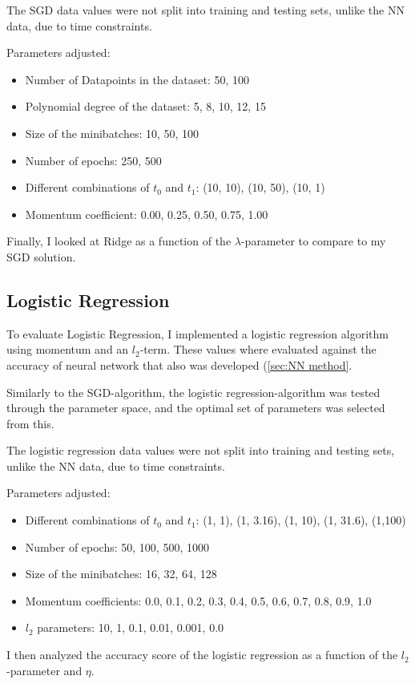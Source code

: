 \documentclass[a4paper, UKenglish]{article}
\newcommand{\0}{\mathbf{0}}
\newcommand{\1}{\mathbf{1}}
\begin{document}
The SGD data values were not split into training and testing sets, unlike the NN data, due to time constraints.

Parameters adjusted:
\begin{itemize}
\item Number of Datapoints in the dataset: 50, 100
\item Polynomial degree of the dataset: 5, 8, 10, 12, 15
\item Size of the minibatches: 10, 50, 100
\item Number of epochs: 250, 500
\item Different combinations of $t_0$ and $t_1$: (10, 10), (10, 50), (10, 1)
\item Momentum coefficient: 0.00, 0.25, 0.50, 0.75, 1.00
\end{itemize}

Finally, I looked at Ridge as a function of the $\lambda$-parameter to compare to my SGD solution.

\subsection{Logistic Regression}
To evaluate Logistic Regression, I implemented a logistic regression algorithm using momentum and an $l_2$-term. These values where evaluated against the accuracy of neural network that also was developed (\autoref{sec:NN method}.

Similarly to the SGD-algorithm, the logistic regression-algorithm was tested through the parameter space, and the optimal set of parameters was selected from this.

The logistic regression data values were not split into training and testing sets, unlike the NN data, due to time constraints.

Parameters adjusted:
\begin{itemize}
\item Different combinations of $t_0$ and $t_1$: (1, 1), (1, 3.16), (1, 10), (1, 31.6), (1,100)
\item Number of epochs: 50, 100, 500, 1000
\item Size of the minibatches: 16, 32, 64, 128
\item Momentum coefficients: 0.0, 0.1, 0.2, 0.3, 0.4, 0.5, 0.6, 0.7, 0.8, 0.9, 1.0
\item $l_2$ parameters: 10, 1, 0.1, 0.01, 0.001, 0.0
\end{itemize}

I then analyzed the accuracy score of the logistic regression as a function of the $l_2$-parameter and $\eta$.
\end{document}
